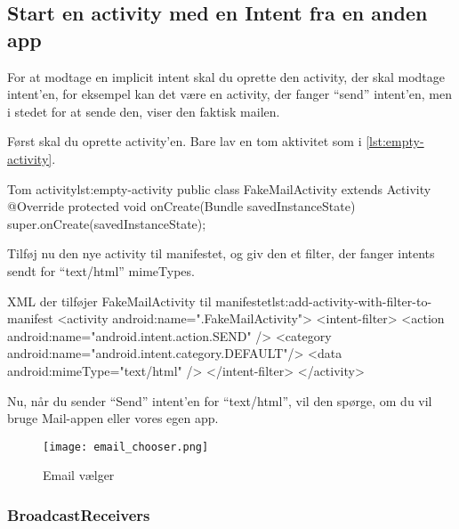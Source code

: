 \subsection{Start en activity med en Intent fra en anden app}

For at modtage en implicit intent skal du oprette den activity, der skal modtage intent'en, for eksempel kan det være en activity, der fanger ``send'' intent'en, men i stedet for at sende den, viser den faktisk mailen.

Først skal du oprette activity'en. Bare lav en tom aktivitet som i \autoref{lst:empty-activity}.

\begin{example}\noindent
	\begin{JavaCode}{Tom activity}{lst:empty-activity}
		public class FakeMailActivity extends Activity {
			@Override
			protected void onCreate(Bundle savedInstanceState) {
				super.onCreate(savedInstanceState);
			}
		}
	\end{JavaCode}
\end{example}

Tilføj nu den nye activity til manifestet, og giv den et filter, der fanger intents sendt for ``text/html'' mimeTypes.

\begin{example}\noindent
	\begin{XmlCode}{XML der tilføjer FakeMailActivity til manifestet}{lst:add-activity-with-filter-to-manifest}
		<activity android:name=".FakeMailActivity">
			<intent-filter>
				<action android:name="android.intent.action.SEND" />
				<category android:name="android.intent.category.DEFAULT"/>
				<data android:mimeType="text/html" />
			</intent-filter>
		</activity>
	\end{XmlCode}
\end{example}

Nu, når du sender ``Send'' intent'en for ``text/html'', vil den spørge, om du vil bruge Mail-appen eller vores egen app.

\begin{figure}[h]
	\begin{center}
		\texttt{[image: email\_chooser.png]}
		\caption{Email vælger}
		\label{fig:android:activities:email_chooser}
	\end{center}
\end{figure}

\subsubsection{BroadcastReceivers}

